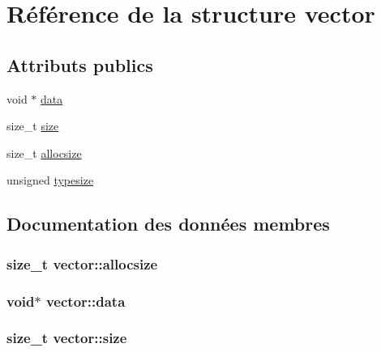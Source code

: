 \hypertarget{structvector}{}\section{Référence de la structure vector}
\label{structvector}
\subsection*{Attributs publics}
\begin{DoxyCompactItemize}
\item 
void $\ast$ \hyperlink{structvector_afee87fd86bbabb017991064293317a8b}{data}
\item 
size\+\_\+t \hyperlink{structvector_a4200005b6949608d6a533db1a0d299c8}{size}
\item 
size\+\_\+t \hyperlink{structvector_a52795ebc16dc899ccb6c1f9f6238921a}{allocsize}
\item 
unsigned \hyperlink{structvector_aab0b37e2650659a664f4c993e6309d42}{typesize}
\end{DoxyCompactItemize}


\subsection{Documentation des données membres}
\hypertarget{structvector_a52795ebc16dc899ccb6c1f9f6238921a}{}
\subsubsection[{allocsize}]{\setlength{\rightskip}{0pt plus 5cm}size\+\_\+t vector\+::allocsize}\label{structvector_a52795ebc16dc899ccb6c1f9f6238921a}
\hypertarget{structvector_afee87fd86bbabb017991064293317a8b}{}
\subsubsection[{data}]{\setlength{\rightskip}{0pt plus 5cm}void$\ast$ vector\+::data}\label{structvector_afee87fd86bbabb017991064293317a8b}
\hypertarget{structvector_a4200005b6949608d6a533db1a0d299c8}{}
\subsubsection[{size}]{\setlength{\rightskip}{0pt plus 5cm}size\+\_\+t vector\+::size}\label{structvector_a4200005b6949608d6a533db1a0d299c8}
\hypertarget{structvector_aab0b37e2650659a664f4c993e6309d42}{}
